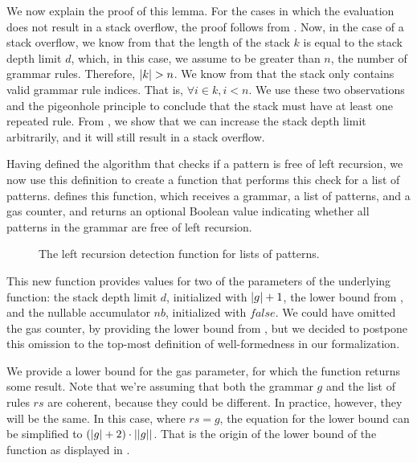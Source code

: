 We now explain the proof of this lemma.
For the cases in which the evaluation
does not result in a stack overflow,
the proof follows from .
Now, in the case of a stack overflow,
we know from 
that the length of the stack $k$ is equal to the stack depth limit $d$,
which, in this case, we assume to be greater than $n$, the number of grammar rules.
Therefore, $|k| > n$.
We know from 
that the stack only contains valid grammar rule indices.
That is, $\forall i \in k, i < n$.
We use these two observations and the pigeonhole principle to conclude
that the stack must have at least one repeated rule.
From ,
we show that we can increase the stack depth limit arbitrarily,
and it will still result in a stack overflow.

Having defined the algorithm
that checks if a pattern is free of left recursion,
we now use this definition to create a function
that performs this check for a list of patterns.
 defines this function,
which receives a grammar, a list of patterns,
and a gas counter,
and returns an optional Boolean value
indicating whether all patterns in the grammar
are free of left recursion.

\begin{figure}
    \centering
    
    \caption{The left recursion detection function for lists of patterns.}
    \label{fig:lverifyrule-function}
\end{figure}

This new function provides values
for two of the parameters of the underlying function:
the stack depth limit $d$, initialized with $|g|+1$,
the lower bound from ,
and the nullable accumulator $nb$, initialized with $false$.
We could have omitted the gas counter,
by providing the lower bound from ,
but we decided to postpone
this omission to the top-most definition
of well-formedness in our formalization.

We provide a lower bound for the gas parameter,
for which the function returns some result.
Note that we're assuming that both the grammar $g$
and the list of rules $rs$ are coherent,
because they could be different.
In practice, however,
they will be the same.
In this case,
where $rs = g$,
the equation for the lower bound can be simplified
to $(|g| + 2) \cdot ||g||$.
That is the origin of the lower bound of the
\textit{\verifygrammarname{}} function
as displayed in .

